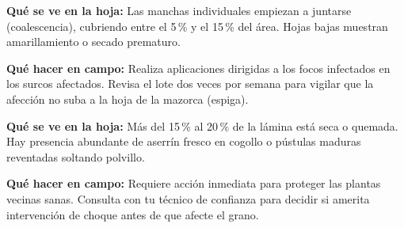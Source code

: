 \documentclass[11pt,a4paper]{report}
\begin{document}
\vspace{1.5mm}
\begin{tcolorbox}[
    enhanced,
    colback=MaizAmberBg,
    colframe=MaizAmber,
    arc=2mm,
    boxrule=1.1pt,
    title={\textbf{Nivel 2: Ya se está extendiendo (Moderado)}},
    fonttitle=\sffamily\bfseries\color{white},
    colbacktitle=MaizAmber,
    attach boxed title to top left={yshift=-2mm,xshift=4mm},
    boxed title style={sharp corners, rounded corners=southeast, colback=MaizAmber},
    top=2.5mm, bottom=2.5mm, left=4mm, right=4mm
]
    \textbf{Qué se ve en la hoja:} Las manchas individuales empiezan a juntarse (coalescencia), cubriendo entre el 5\,\% y el 15\,\% del área. Hojas bajas muestran amarillamiento o secado prematuro.
    
    \vspace{1.5mm}
    \textbf{Qué hacer en campo:} Realiza aplicaciones dirigidas a los focos infectados en los surcos afectados. Revisa el lote dos veces por semana para vigilar que la afección no suba a la hoja de la mazorca (espiga).
\end{tcolorbox}

\vspace{1.5mm}
\begin{tcolorbox}[
    enhanced,
    colback=MaizRedBg!70,
    colframe=MaizRed,
    arc=2mm,
    boxrule=1.1pt,
    title={\textbf{Nivel 3: Daño grave (Crítico)}},
    fonttitle=\sffamily\bfseries\color{white},
    colbacktitle=MaizRed,
    attach boxed title to top left={yshift=-2mm,xshift=4mm},
    boxed title style={sharp corners, rounded corners=southeast, colback=MaizRed},
    top=2.5mm, bottom=2.5mm, left=4mm, right=4mm
]
    \textbf{Qué se ve en la hoja:} Más del 15\,\% al 20\,\% de la lámina está seca o quemada. Hay presencia abundante de aserrín fresco en cogollo o pústulas maduras reventadas soltando polvillo.
    
    \vspace{1.5mm}
    \textbf{Qué hacer en campo:} Requiere acción inmediata para proteger las plantas vecinas sanas. Consulta con tu técnico de confianza para decidir si amerita intervención de choque antes de que afecte el grano.
\end{tcolorbox}

\vspace{2mm}
\end{document}
